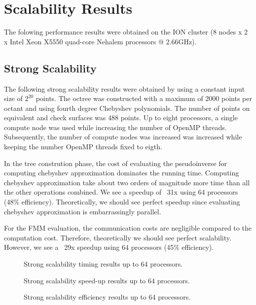\documentclass[11pt]{article}
\begin{document}
\section{Scalability Results}
The folowing performance results were obtained on the ION cluster (8 nodes x 2 
x Intel Xeon X5550 quad-core Nehalem processors @ 2.66GHz).

\subsection{Strong Scalability}
The following strong scalability results were obtained by using a constant 
input size of $2^{20}$ points. The octree was constructed with a maximum of 
$2000$ points per octant and using fourth degree Chebyshev polynomials. The 
number of points on equivalent and check surfaces was 488 points.
Up to eight processors, a single compute node was used while increasing the 
number of OpenMP threads. Subsequently, the number of compute nodes was 
increased was increased while keeping the number OpenMP threads fixed to eigth.

In the tree constrution phase, the cost of evaluating the pseudoinverse for 
computing chebyshev approximation dominates the running time. Computing 
chebyshev approximation take about two orders of magnitude more time than all 
the other operations combined. We see a speedup of ~31x using 64 processors 
(48\% efficiency). Theoretically, we should see perfect speedup since 
evaluating chebyshev approximation is embarrassingly parallel.

For the FMM evaluation, the communication costs are negligible compared to the 
computation cost. Therefore, theoretically we should see perfect scalability. 
However, we see a ~29x speedup using 64 processors (45\% efficiency).


\begin{figure}[H]
\centering
\caption{Strong scalability timing results up to 64 processors.}
\end{figure}

\begin{figure}[H]
\centering
\caption{Strong scalability speed-up results up to 64 processors.}
\end{figure}

\begin{figure}[H]
\centering
\caption{Strong scalability efficiency results up to 64 processors.}
\end{figure}
\end{document}
